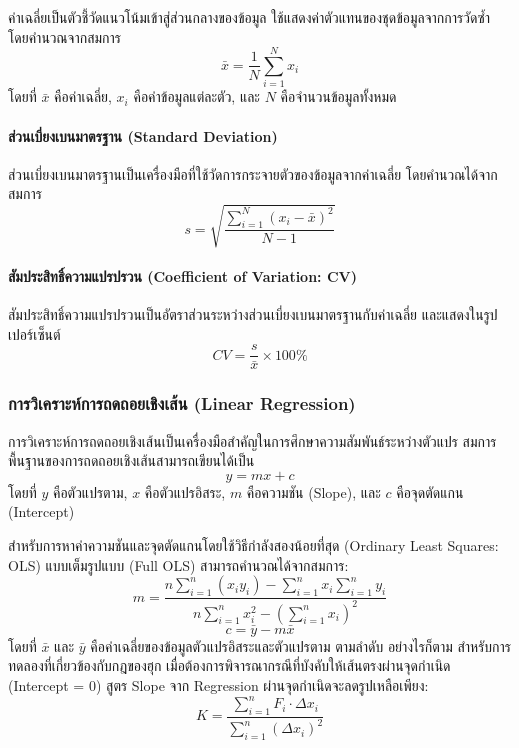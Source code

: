 ค่าเฉลี่ยเป็นตัวชี้วัดแนวโน้มเข้าสู่ส่วนกลางของข้อมูล ใช้แสดงค่าตัวแทนของชุดข้อมูลจากการวัดซ้ำ โดยคำนวณจากสมการ
\begin{equation}
    \bar{x} = \frac{1}{N}\sum_{i=1}^{N} x_i
    \label{eq:mean}
\end{equation}
โดยที่ $\bar{x}$ คือค่าเฉลี่ย, $x_i$ คือค่าข้อมูลแต่ละตัว, และ $N$ คือจำนวนข้อมูลทั้งหมด

\paragraph{ส่วนเบี่ยงเบนมาตรฐาน (Standard Deviation)}

ส่วนเบี่ยงเบนมาตรฐานเป็นเครื่องมือที่ใช้วัดการกระจายตัวของข้อมูลจากค่าเฉลี่ย โดยคำนวณได้จากสมการ
\begin{equation}
    s = \sqrt{\frac{\sum_{i=1}^{N}(x_i - \bar{x})^2}{N-1}}
    \label{eq:std}
\end{equation}

\paragraph{สัมประสิทธิ์ความแปรปรวน (Coefficient of Variation: CV)}

สัมประสิทธิ์ความแปรปรวนเป็นอัตราส่วนระหว่างส่วนเบี่ยงเบนมาตรฐานกับค่าเฉลี่ย และแสดงในรูปเปอร์เซ็นต์
\begin{equation}
    CV = \frac{s}{\bar{x}} \times 100\%
    \label{eq:cv}
\end{equation}

\subsubsection{การวิเคราะห์การถดถอยเชิงเส้น (Linear Regression)}

การวิเคราะห์การถดถอยเชิงเส้นเป็นเครื่องมือสำคัญในการศึกษาความสัมพันธ์ระหว่างตัวแปร สมการพื้นฐานของการถดถอยเชิงเส้นสามารถเขียนได้เป็น
\begin{equation}
    y = mx + c
\end{equation}
โดยที่ $y$ คือตัวแปรตาม, $x$ คือตัวแปรอิสระ, $m$ คือความชัน (Slope), และ $c$ คือจุดตัดแกน (Intercept)

สำหรับการหาค่าความชันและจุดตัดแกนโดยใช้วิธีกำลังสองน้อยที่สุด (Ordinary Least Squares: OLS) แบบเต็มรูปแบบ (Full OLS) สามารถคำนวณได้จากสมการ:
\begin{equation}
    m = \frac{n\sum_{i=1}^{n} (x_i y_i) - \sum_{i=1}^{n} x_i \sum_{i=1}^{n} y_i}{n\sum_{i=1}^{n} x_i^2 - (\sum_{i=1}^{n} x_i)^2}
    \label{eq:full_ols_slope}
\end{equation}
\begin{equation}
    c = \bar{y} - m\bar{x}
    \label{eq:full_ols_intercept}
\end{equation}
โดยที่ $\bar{x}$ และ $\bar{y}$ คือค่าเฉลี่ยของข้อมูลตัวแปรอิสระและตัวแปรตาม ตามลำดับ
อย่างไรก็ตาม สำหรับการทดลองที่เกี่ยวข้องกับกฎของฮุก เมื่อต้องการพิจารณากรณีที่บังคับให้เส้นตรงผ่านจุดกำเนิด (Intercept = 0) สูตร Slope จาก Regression ผ่านจุดกำเนิดจะลดรูปเหลือเพียง:
\begin{equation}
    K = \frac{\displaystyle\sum_{i=1}^{n} F_i \cdot \Delta x_i}{\displaystyle\sum_{i=1}^{n} (\Delta x_i)^2}
    \label{eq:regression_slope}
\end{equation}


